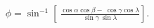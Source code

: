 \documentclass[preview]{standalone}
\begin{document}
\begin{align*}
\phi = \sin^{-1} \left[\
                            \frac{ \cos\alpha \cos\beta -\
                            \cos\gamma \cos\lambda }{ \sin\gamma \
                            \sin\lambda } \right].
\end{align*}
\end{document}
